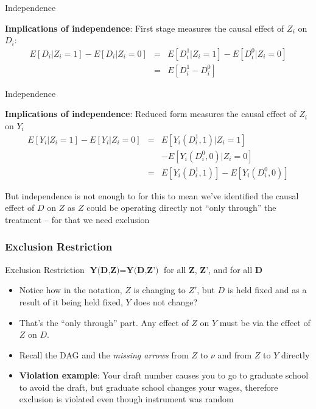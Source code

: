 \documentclass{beamer}
\begin{document}
\begin{frame}{Independence}

  \textbf{Implications of independence}: First stage measures the causal effect of $Z_i$ on $D_i$:
  \begin{eqnarray*}
    E[D_i|Z_i=1] - E[D_i|Z_i=0] &=& E[D^1_{i} | Z_i = 1] - E[D^0_{i}|Z_i = 0] \\
    &=& E[D^1_{i} - D^0_{i}]
  \end{eqnarray*}

\end{frame}

\begin{frame}{Independence}

  \textbf{Implications of independence}: Reduced form measures the causal effect of $Z_i$ on $Y_i$
  \begin{eqnarray*}
    E[Y_i | Z_i=1] - E[Y_i | Z_i=0] &=& E[Y_i(D^1_{i},1)|Z_i = 1] \\
    && - E[Y_i(D^0_{i},0) | Z_i = 0] \\
    &=&E[Y_i(D^1_{i},1)] - E[Y_i(D^0_{i},0)]
  \end{eqnarray*}

  \bigskip

  But independence is not enough to for this to mean we've identified the causal effect of $D$ on $Z$ as $Z$ could be operating directly not ``only through'' the treatment -- for that we need exclusion
\end{frame}

\begin{frame}[plain]
  \frametitle{Exclusion Restriction}

  \begin{block}{Exclusion Restriction}
    $\textbf{Y(D,Z)}=\textbf{Y(D,Z')}$ for all $\textbf{Z}$, $\textbf{Z'}$, and for all $\textbf{D}$
  \end{block}

  \begin{itemize}
    \item Notice how in the notation, $Z$ is changing to $Z'$, but $D$ is held fixed and as a result of it being held fixed, $Y$ does not change?
    \item  That's the ``only through'' part. Any effect of $Z$ on $Y$ must be via the effect of $Z$ on $D$.
    \item Recall the DAG and the \emph{missing arrows} from $Z$ to $\nu$ and from $Z$ to $Y$ directly
    \item \textbf{Violation example}:  Your draft number causes you to go to graduate school to avoid the draft, but graduate school changes your wages, therefore exclusion is violated even though instrument was random
  \end{itemize}

\end{frame}
\end{document}
